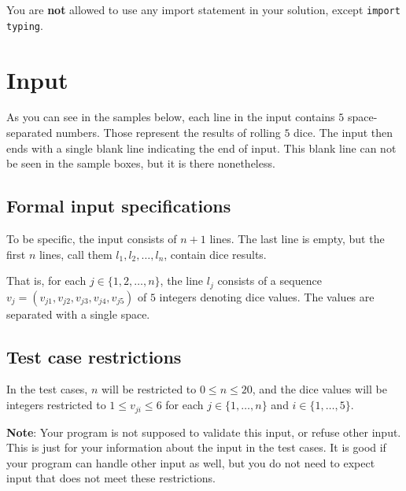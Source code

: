 You are \textbf{not} allowed to use any import statement in your solution, except \texttt{import typing}.

\section*{Input}

As you can see in the samples below,
each line in the input contains $5$ space-separated numbers.
Those represent the results of rolling $5$ dice.
The input then ends with a single blank line
indicating the end of input.
This blank line can not be seen in the sample boxes,
but it is there nonetheless.

\subsection*{Formal input specifications}

To be specific, the input consists of $n + 1$ lines.
The last line is empty, but the first $n$ lines,
call them $l_1, l_2, \dots, l_n$,
contain dice results.

That is, for each $j\in \{1, 2, \dots, n\}$,
the line $l_j$ consists of a sequence $v_j=(v_{j1}, v_{j2}, v_{j3}, v_{j4}, v_{j5})$
of $5$ integers denoting dice values.
The values are separated with a single space.

\subsection*{Test case restrictions}

In the test cases, $n$ will be restricted to $0\le n \le 20$,
and the dice values will be integers restricted to $1 \le v_{ji} \le 6$
for each $j\in \{1, \dots, n\}$ and $i\in \{1, \dots, 5\}$.

\textbf{Note}: Your program is not supposed to validate this input, or refuse other input.
This is just for your information about the input in the test cases. 
It is good if your program can handle other input as well,
but you do not need to expect input that does not meet these restrictions.


